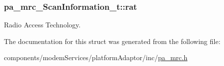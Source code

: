 \subsubsection[{\texorpdfstring{rat}{rat}}]{ pa\+\_\+mrc\+\_\+\+Scan\+Information\+\_\+t\+::rat}\hypertarget{structpa__mrc___scan_information__t_a5749af30ae56c054d1cd05f32132cfa2}{}\label{structpa__mrc___scan_information__t_a5749af30ae56c054d1cd05f32132cfa2}


Radio Access Technology. 



The documentation for this struct was generated from the following file\+:\begin{DoxyCompactItemize}
\item 
components/modem\+Services/platform\+Adaptor/inc/\hyperlink{pa__mrc_8h}{pa\+\_\+mrc.\+h}\end{DoxyCompactItemize}
